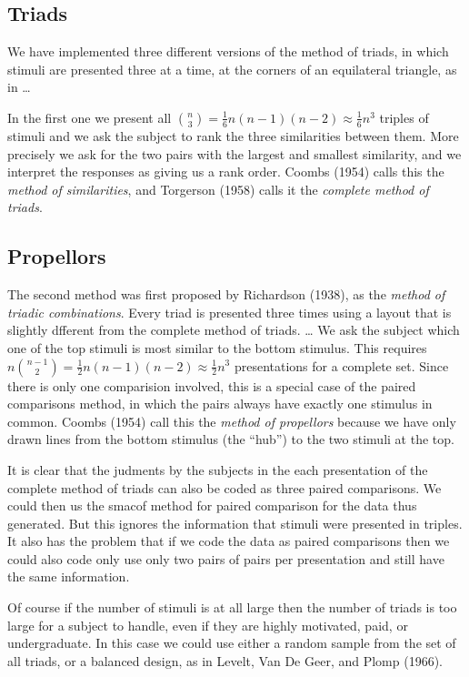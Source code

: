 \documentclass[
  12pt,
]{article}
\begin{document}
\subsection{Triads}\label{triads}

We have implemented three different versions of the method of triads, in which stimuli are presented three at a time,
at the corners of an equilateral triangle, as in
\ldots{}

In the first one we present all
\(\binom{n}{3}=\frac16 n(n-1)(n-2)\approx\frac16n^3\)
triples of stimuli and we ask the subject to rank the
three similarities between them. More precisely we ask for the two pairs with the largest and smallest similarity,
and we interpret the responses as giving us a rank order.
Coombs (1954) calls this the \emph{method of similarities},
and Torgerson (1958) calls it the \emph{complete method of triads}.

\subsection{Propellors}\label{propellors}

The second method was first proposed by Richardson (1938),
as the \emph{method of triadic combinations}. Every triad is presented three times using a layout that is slightly dfferent from the complete method of triads.
\ldots{}
We ask the subject which one of the top stimuli is most similar to the bottom stimulus. This requires
\(n\binom{n-1}{2}=\frac12n(n-1)(n-2)\approx\frac12n^3\)
presentations for a complete set. Since there is only
one comparision involved, this is a special case of
the paired comparisons method, in which the pairs always
have exactly one stimulus in common. Coombs (1954) call this the \emph{method of propellors} because we have only drawn lines from the bottom stimulus (the ``hub'') to the two stimuli at the top.

It is clear that the judments by the subjects in the each presentation of the complete method of triads can also be
coded as three paired comparisons. We could then us the
smacof method for paired comparison for the data thus
generated. But this ignores the information that stimuli were presented in triples. It also has the problem that
if we code the data as paired comparisons then we could also code only use only two pairs of pairs per presentation and still have the same information.

Of course if the number of stimuli is at all large
then the number of triads is too large for a subject to handle, even if they are highly motivated, paid, or
undergraduate. In this case we could use either
a random sample from the set of all triads, or a
balanced design, as in Levelt, Van De Geer, and Plomp (1966).
\end{document}
